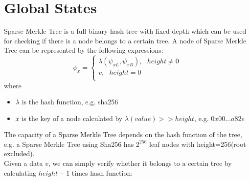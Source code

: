 \documentclass[a4paper,12pt]{article}
\begin{document}
\section{Global States}
\label{sec:org9b71832}
Sparse Merkle Tree is a full binary hash tree with fixed-depth which can be used for checking if there is a node belongs to a certain tree. A node of Sparse Merkle Tree can be represented by the following expressions:\\
\begin{equation*}
    \psi_{x} =
    \begin{cases}
      \lambda(\psi_{xL}, \psi_{xR}), \text{ } height \ne 0\\
      v, \text{ } height = 0\\
    \end{cases}
\end{equation*}
where\\
\begin{itemize}
    \item $\lambda$ is the hash function, e.g. sha256
    \item $x$ is the key of a node calculated by $\lambda(value) >> height$, e.g. $0x00...a82e$
\end{itemize}
The capacity of a Sparse Merkle Tree depends on the hash function of the tree, e.g. a Sparse Merkle Tree using Sha256 has \(2^{256}\) leaf nodes with height=256(root excluded).\\
Given a data \(v\), we can simply verify whether it belongs to a certain tree by calculating \(height-1\) times hash function:\\
\end{document}
